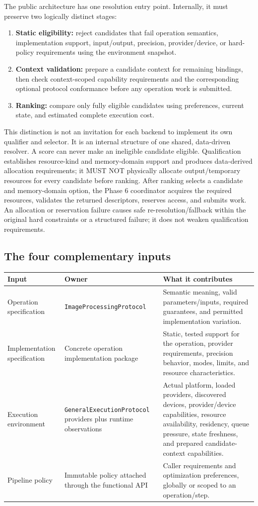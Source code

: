 \documentclass[11pt,a4paper,oneside]{article}
\begin{document}
The public architecture has one resolution entry point. Internally, it must preserve two logically distinct stages:
\begin{enumerate}
  \item \textbf{Static eligibility:} reject candidates that fail operation semantics, implementation support, input/output, precision, provider/device, or hard-policy requirements using the environment snapshot.
  \item \textbf{Context validation:} prepare a candidate context for remaining bindings, then check context-scoped capability requirements and the corresponding optional protocol conformance before any operation work is submitted.
  \item \textbf{Ranking:} compare only fully eligible candidates using preferences, current state, and estimated complete execution cost.
\end{enumerate}
This distinction is not an invitation for each backend to implement its own qualifier and selector. It is an internal structure of one shared, data-driven resolver. A score can never make an ineligible candidate eligible. Qualification establishes resource-kind and memory-domain support and produces data-derived allocation requirements; it MUST NOT physically allocate output/temporary resources for every candidate before ranking. After ranking selects a candidate and memory-domain option, the Phase 6 coordinator acquires the required resources, validates the returned descriptors, reserves access, and submits work. An allocation or reservation failure causes safe re-resolution/fallback within the original hard constraints or a structured failure; it does not weaken qualification requirements.

\subsection{The four complementary inputs}

\begin{longtable}{@{}L{0.20\textwidth}L{0.30\textwidth}Z{0.39\textwidth}@{}}
\toprule
\textbf{Input} & \textbf{Owner} & \textbf{What it contributes} \\
\midrule
Operation specification & \texttt{ImageProcessing\allowbreak Protocol} & Semantic meaning, valid parameters/inputs, required guarantees, and permitted implementation variation. \\
Implementation specification & Concrete operation implementation package & Static, tested support for the operation, provider requirements, precision behavior, modes, limits, and resource characteristics. \\
Execution environment & \texttt{GeneralExecution\allowbreak Protocol} providers plus runtime observations & Actual platform, loaded providers, discovered devices, provider/device capabilities, resource availability, residency, queue pressure, state freshness, and prepared candidate-context capabilities. \\
Pipeline policy & Immutable policy attached through the functional API & Caller requirements and optimization preferences, globally or scoped to an operation/step. \\
\bottomrule
\end{longtable}
\end{document}
